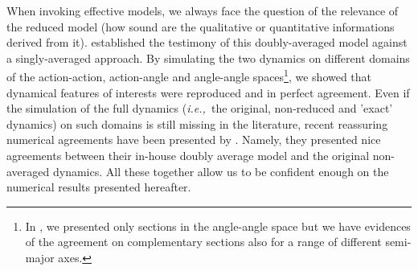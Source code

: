 \documentclass{amsart}
\theoremstyle{definition}
\theoremstyle{remark}
\numberwithin{equation}{section}
\newcommand{\ie}{\textit{i.e.,\ }}
\begin{document}
When invoking effective models, we always face the question of the relevance of the reduced model (how sound are the qualitative or quantitative informations derived from it). \cite{iGk16} established the testimony of this doubly-averaged model against a singly-averaged approach. By simulating the two dynamics on different domains of the action-action, action-angle and angle-angle spaces\footnote{In \cite{iGk16}, we presented only sections in the angle-angle space but we have evidences of the agreement on complementary sections also for a range of different semi-major {\color{black}axes.}}, we showed that dynamical features of interests were reproduced and in perfect agreement. Even if the simulation of the full dynamics (\ie the original, non-reduced and 'exact' dynamics) on such domains is still missing in the literature, recent reassuring numerical agreements have been presented by \cite{rAr18}. Namely, they presented nice agreements between their in-house doubly average model and the original non-averaged dynamics. All these together allow us to be confident enough on the numerical  results presented hereafter.  
 

\end{document}
